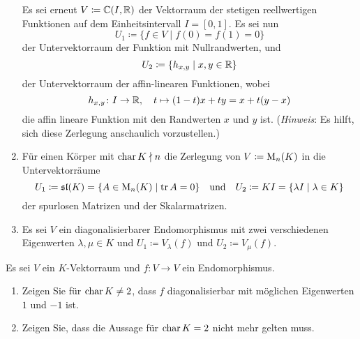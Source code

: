 \documentclass[a4paper,10pt]{scrartcl}
\begin{document}
\begin{question}
\begin{enumerate}[leftmargin=*]
      Es sei erneut $V \coloneqq \mathbb{C}(I, \mathbb{R})$ der Vektorraum der stetigen reellwertigen Funktionen auf dem Einheitsintervall $I = [0,1]$.
     Es sei nun
      \[
        U_1 \coloneqq \{ f \in V \mid f(0) = f(1) = 0 \}
      \]
      der Untervektorraum der Funktion mit Nullrandwerten, und
      \[
        U_2 \coloneqq \{ h_{x,y} \mid x, y \in \mathbb{R} \}
      \]
      der Untervektorraum der affin-linearen Funktionen, wobei
      \[
        h_{x,y} \colon I \to \mathbb{R},
        \quad
        t \mapsto (1-t)x + ty = x + t(y-x)
      \]
      die affin lineare Funktion mit den Randwerten $x$ und $y$ ist.
      (\emph{Hinweis}: Es hilft, sich diese Zerlegung anschaulich vorzustellen.)
    \item
      Für einen Körper mit $\operatorname{char} K \nmid n$ die Zerlegung von $V \coloneqq \operatorname{M}_n(K)$ in die Untervektorräume
      \[
        U_1 \coloneqq \mathfrak{sl}(K) = \{ A \in \operatorname{M}_n(K) \mid \operatorname{tr} A  = 0 \}
        \quad\text{und}\quad
        U_2 \coloneqq K I = \{ \lambda I \mid \lambda \in K \}
      \]
      der spurlosen Matrizen und der Skalarmatrizen.
    \item
      Es sei $V$ ein diagonalisierbarer Endomorphismus mit zwei verschiedenen Eigenwerten $\lambda, \mu \in K$ und $U_1 \coloneqq V_\lambda(f)$ und $U_2 \coloneqq V_\mu(f)$.
  \end{enumerate}
\end{question}








\begin{question}
  Es sei $V$ ein $K$-Vektorraum und $f \colon V \to V$ ein Endomorphismus.
  \begin{enumerate}[leftmargin=*]
    \item
      Zeigen Sie für $\operatorname{char} K \neq 2$, dass $f$ diagonalisierbar mit möglichen Eigenwerten $1$ und $-1$ ist.
    \item
      Zeigen Sie, dass die Aussage für $\operatorname{char} K = 2$ nicht mehr gelten muss.
  \end{enumerate}
\end{question}
\end{document}
